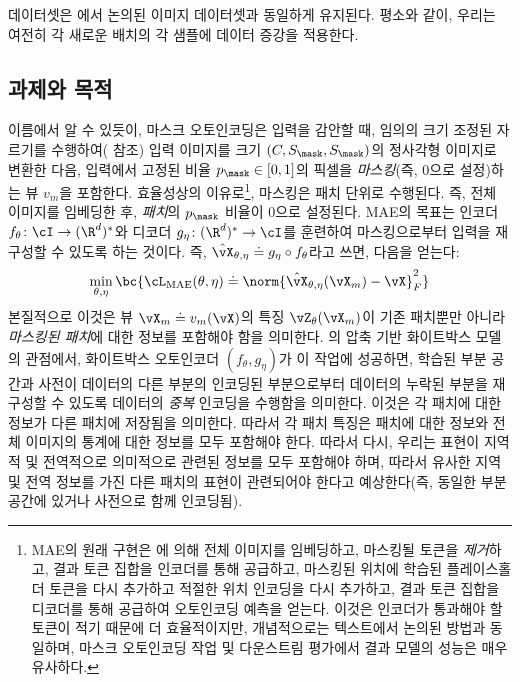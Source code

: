 \documentclass[../../book-main_ko.tex]{subfiles}
\begin{document}
데이터셋은 에서 논의된 이미지 데이터셋과 동일하게 유지된다. 평소와 같이, 우리는 여전히 각 새로운 배치의 각 샘플에 데이터 증강을 적용한다.

\subsection{과제와 목적}\label{sub:image_completion_objective}

이름에서 알 수 있듯이, 마스크 오토인코딩은 입력을 감안할 때, 임의의 크기 조정된 자르기를 수행하여( 참조) 입력 이미지를 크기 \((C, S_{\mask}, S_{\mask})\)의 정사각형 이미지로 변환한 다음, 입력에서 고정된 비율 \(p_{\mask} \in [0, 1]\)의 픽셀을 \textit{마스킹}(즉, 0으로 설정)하는 뷰 \(v_{m}\)을 포함한다. 효율성상의 이유로\footnote{MAE의 원래 구현은 \cite{he2022masked}에 의해 전체 이미지를 임베딩하고, 마스킹될 토큰을 \textit{제거}하고, 결과 토큰 집합을 인코더를 통해 공급하고, 마스킹된 위치에 학습된 플레이스홀더 토큰을 다시 추가하고 적절한 위치 인코딩을 다시 추가하고, 결과 토큰 집합을 디코더를 통해 공급하여 오토인코딩 예측을 얻는다. 이것은 인코더가 통과해야 할 토큰이 적기 때문에 더 효율적이지만, 개념적으로는 텍스트에서 논의된 방법과 동일하며, 마스크 오토인코딩 작업 및 다운스트림 평가에서 결과 모델의 성능은 매우 유사하다.}, 마스킹은 패치 단위로 수행된다. 즉, 전체 이미지를 임베딩한 후, \textit{패치}의 \(p_{\mask}\) 비율이 0으로 설정된다. MAE의 목표는 인코더 \(f_{\theta} \colon \cI \to (\R^{d})^{*}\)와 디코더 \(g_{\eta} \colon (\R^{d})^{*} \to \cI\)를 훈련하여 마스킹으로부터 입력을 재구성할 수 있도록 하는 것이다. 즉, \(\hat{\vX}_{\theta, \eta} \doteq g_{\eta} \circ f_{\theta}\)라고 쓰면, 다음을 얻는다:
\begin{equation}
    \min_{\theta, \eta}\bc{\cL_{\mathrm{MAE}}(\theta, \eta) \doteq \norm{\hat{\vX}_{\theta, \eta}(\vX_{m}) - \vX}_{F}^{2}}
\end{equation}
본질적으로 이것은 뷰 \(\vX_{m} \doteq v_{m}(\vX)\)의 특징 \(\vZ_{\theta}(\vX_{m})\)이 기존 패치뿐만 아니라 \textit{마스킹된 패치}에 대한 정보를 포함해야 함을 의미한다. 의 압축 기반 화이트박스 모델의 관점에서, 화이트박스 오토인코더 \((f_{\theta}, g_{\eta})\)가 이 작업에 성공하면, 학습된 부분 공간과 사전이 데이터의 다른 부분의 인코딩된 부분으로부터 데이터의 누락된 부분을 재구성할 수 있도록 데이터의 \textit{중복} 인코딩을 수행함을 의미한다. 이것은 각 패치에 대한 정보가 다른 패치에 저장됨을 의미한다. 따라서 각 패치 특징은 패치에 대한 정보와 전체 이미지의 통계에 대한 정보를 모두 포함해야 한다. 따라서 다시, 우리는 표현이 지역적 및 전역적으로 의미적으로 관련된 정보를 모두 포함해야 하며, 따라서 유사한 지역 및 전역 정보를 가진 다른 패치의 표현이 관련되어야 한다고 예상한다(즉, 동일한 부분 공간에 있거나 사전으로 함께 인코딩됨).
\end{document}
